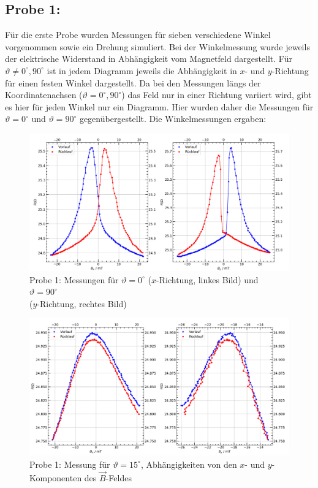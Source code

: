 \documentclass[german,  %
parskip=full,  %
]{scrartcl}
\begin{document}
\subsection{Probe 1:}
Für die erste Probe wurden Messungen für sieben verschiedene Winkel vorgenommen sowie ein Drehung simuliert. Bei der Winkelmessung wurde jeweils der elektrische Widerstand in Abhängigkeit vom Magnetfeld dargestellt. Für \(\vartheta\neq 0^{\circ},90^{\circ}\) ist in jedem Diagramm jeweils die Abhängigkeit in \(x\)- und \(y\)-Richtung für einen festen Winkel dargestellt. Da bei den Messungen längs der Koordinatenachsen (\(\vartheta = 0^{\circ},90^{\circ}\)) das Feld nur in einer Richtung variiert wird, gibt es hier für jeden Winkel nur ein Diagramm. Hier wurden daher die Messungen für  \(\vartheta = 0^{\circ}\) und \(\vartheta = 90^{\circ}\) gegenübergestellt. Die Winkelmessungen ergaben:
\newpage
\begin{figure}[h!]\centering
\includegraphics[width=\textwidth]{Probe1_0_und_90_Grad.png}
\caption{Probe 1: Messungen für \(\vartheta=0^{\circ}\) (\(x\)-Richtung, linkes Bild) und \(\vartheta=90^{\circ}\) \\ (\(y\)-Richtung, rechtes Bild)}
\end{figure} 
\begin{figure}[h!]\centering
\includegraphics[width=\textwidth]{Probe1_15_Grad.png}
\caption{Probe 1: Messung für \(\vartheta=15^{\circ}\), Abhängigkeiten von den \(x\)- und \(y\)-Komponenten des \(\vec{B}\)-Feldes}
\end{figure} 
\end{document}
